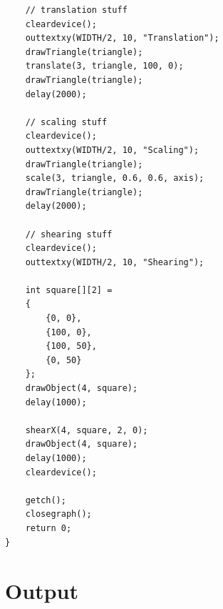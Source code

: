 \documentclass[12pt]{article}
\begin{document}
\begin{verbatim}
    // translation stuff
    cleardevice();
    outtextxy(WIDTH/2, 10, "Translation");
    drawTriangle(triangle);
    translate(3, triangle, 100, 0);
    drawTriangle(triangle);
    delay(2000);

    // scaling stuff
    cleardevice();
    outtextxy(WIDTH/2, 10, "Scaling");
    drawTriangle(triangle);
    scale(3, triangle, 0.6, 0.6, axis);
    drawTriangle(triangle);
    delay(2000);

    // shearing stuff
    cleardevice();
    outtextxy(WIDTH/2, 10, "Shearing");

    int square[][2] = 
    {
        {0, 0},
        {100, 0},
        {100, 50},
        {0, 50}
    };
    drawObject(4, square);
    delay(1000);

    shearX(4, square, 2, 0);
    drawObject(4, square);
    delay(1000);
    cleardevice();

    getch();
    closegraph();
    return 0;
}

\end{verbatim}

	\newpage
	\section{Output}
\end{document}
